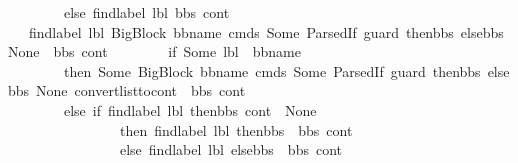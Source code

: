 \begin{isabellebody}
\ \ \ \ \ \ \ \ else\ {\isacharparenleft}{\kern0pt}find{\isacharunderscore}{\kern0pt}label\ lbl\ bbs\ cont{\isacharparenright}{\kern0pt}{\isacharparenright}{\kern0pt}{\isachardoublequoteclose}\ \isanewline
\ \ {\isacharbar}{\kern0pt}\ {\isachardoublequoteopen}find{\isacharunderscore}{\kern0pt}label\ lbl\ {\isacharparenleft}{\kern0pt}{\isacharparenleft}{\kern0pt}BigBlock\ bb{\isacharunderscore}{\kern0pt}name\ cmds\ {\isacharparenleft}{\kern0pt}Some\ {\isacharparenleft}{\kern0pt}ParsedIf\ guard\ then{\isacharunderscore}{\kern0pt}bbs\ else{\isacharunderscore}{\kern0pt}bbs{\isacharparenright}{\kern0pt}{\isacharparenright}{\kern0pt}\ None{\isacharparenright}{\kern0pt}\ {\isacharhash}{\kern0pt}\ bbs{\isacharparenright}{\kern0pt}\ cont\ {\isacharequal}{\kern0pt}\ \isanewline
\ \ \ \ \ \ {\isacharparenleft}{\kern0pt}if\ {\isacharparenleft}{\kern0pt}Some\ lbl\ {\isacharequal}{\kern0pt}\ bb{\isacharunderscore}{\kern0pt}name{\isacharparenright}{\kern0pt}\ \isanewline
\ \ \ \ \ \ \ \ then\ {\isacharparenleft}{\kern0pt}Some\ {\isacharparenleft}{\kern0pt}{\isacharparenleft}{\kern0pt}BigBlock\ bb{\isacharunderscore}{\kern0pt}name\ cmds\ {\isacharparenleft}{\kern0pt}Some\ {\isacharparenleft}{\kern0pt}ParsedIf\ guard\ then{\isacharunderscore}{\kern0pt}bbs\ else{\isacharunderscore}{\kern0pt}bbs{\isacharparenright}{\kern0pt}{\isacharparenright}{\kern0pt}\ None{\isacharparenright}{\kern0pt}{\isacharcomma}{\kern0pt}\ {\isacharparenleft}{\kern0pt}convert{\isacharunderscore}{\kern0pt}list{\isacharunderscore}{\kern0pt}to{\isacharunderscore}{\kern0pt}cont\ {\isacharparenleft}{\kern0pt}\ bbs{\isacharparenright}{\kern0pt}\ cont{\isacharparenright}{\kern0pt}{\isacharparenright}{\kern0pt}{\isacharparenright}{\kern0pt}\ \isanewline
\ \ \ \ \ \ \ \ else\ {\isacharparenleft}{\kern0pt}if\ {\isacharparenleft}{\kern0pt}find{\isacharunderscore}{\kern0pt}label\ lbl\ then{\isacharunderscore}{\kern0pt}bbs\ cont\ {\isasymnoteq}\ None{\isacharparenright}{\kern0pt}\ \isanewline
\ \ \ \ \ \ \ \ \ \ \ \ \ \ \ \ then\ {\isacharparenleft}{\kern0pt}find{\isacharunderscore}{\kern0pt}label\ lbl\ {\isacharparenleft}{\kern0pt}then{\isacharunderscore}{\kern0pt}bbs\ {\isacharat}{\kern0pt}\ bbs{\isacharparenright}{\kern0pt}\ cont{\isacharparenright}{\kern0pt}\ \isanewline
\ \ \ \ \ \ \ \ \ \ \ \ \ \ \ \ else\ {\isacharparenleft}{\kern0pt}find{\isacharunderscore}{\kern0pt}label\ lbl\ {\isacharparenleft}{\kern0pt}else{\isacharunderscore}{\kern0pt}bbs\ {\isacharat}{\kern0pt}\ bbs{\isacharparenright}{\kern0pt}\ cont{\isacharparenright}{\kern0pt}{\isacharparenright}{\kern0pt}{\isacharparenright}{\kern0pt}{\isachardoublequoteclose}\ \isanewline

\end{isabellebody}
